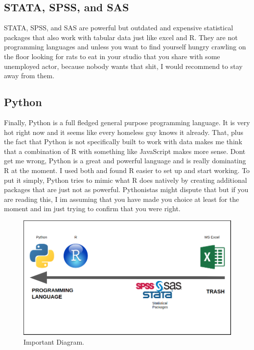 \documentclass[]{book}
\begin{document}
\hypertarget{stata-spss-and-sas}{%
\subsection{STATA, SPSS, and SAS}\label{stata-spss-and-sas}}

STATA, SPSS, and SAS are powerful but outdated and expensive statistical packages that also work with tabular data just like excel and R. They are not programming languages and unless you want to find yourself hungry crawling on the floor looking for rats to eat in your studio that you share with some unemployed actor, because nobody wants that shit, I would recommend to stay away from them.

\hypertarget{python}{%
\subsection{Python}\label{python}}

Finally, Python is a full fledged general purpose programming language. It is very hot right now and it seems like every homeless guy knows it already. That, plus the fact that Python is not specifically built to work with data makes me think that a combination of R with something like JavaScript makes more sense. Dont get me wrong, Python is a great and powerful language and is really dominating R at the moment. I used both and found R easier to set up and start working. To put it simply, Python tries to mimic what R does natively by creating additional packages that are just not as powerful. Pythonistas might dispute that but if you are reading this, I im assuming that you have made you choice at least for the moment and im just trying to confirm that you were right.

\begin{figure}
\centering
\includegraphics{trash.png}
\caption{Important Diagram.}
\end{figure}
\end{document}
